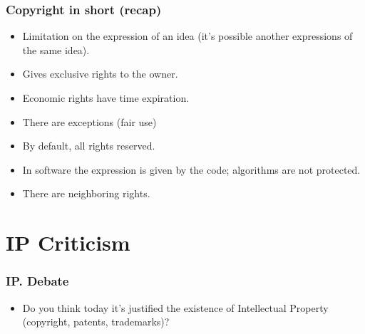 \documentclass{beamer}
\begin{document}

\begin{frame}
\frametitle{Copyright in short (recap)}

\begin{itemize}
\item Limitation on the \alert{expression} of an idea (it's possible another expressions of the same idea).
\item Gives exclusive rights to the owner.
\item Economic rights have time expiration.
\item There are exceptions (fair use)
\item By default, all rights reserved.
\item In software the expression is given by the code; algorithms are
not protected.
\item There are neighboring rights.

\end{itemize}

\end{frame}

\section{IP Criticism}


\begin{frame}
\frametitle{IP. Debate}

\large
\begin{itemize}
\item Do you think today it's justified the existence of Intellectual Property (copyright, patents, trademarks)?
\end{itemize}

\end{frame}



\end{document}
